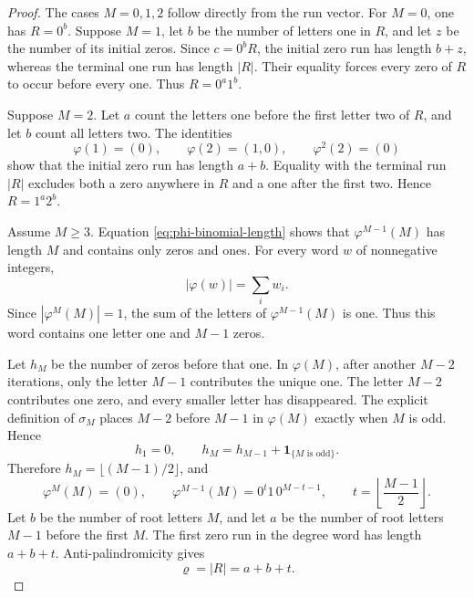 \documentclass[11pt]{article}
\theoremstyle{definition}
\theoremstyle{remark}
\begin{document}
\begin{proof}
The cases \(M=0,1,2\) follow directly from the run vector.  For
\(M=0\), one has \(R=0^b\).  Suppose \(M=1\), let \(b\) be the number of
letters one in \(R\), and let \(z\) be the number of its initial zeros.
Since \(c=0^bR\), the initial zero run has length \(b+z\), whereas the
terminal one run has length \(|R|\).  Their equality forces every zero of
\(R\) to occur before every one.  Thus \(R=0^a1^b\).

Suppose \(M=2\).  Let \(a\) count the letters one before the first letter two
of \(R\), and let \(b\) count all letters two.  The identities
\[
 \varphi(1)=(0),
 \qquad \varphi(2)=(1,0),
 \qquad \varphi^2(2)=(0)
\]
show that the initial zero run has length \(a+b\).  Equality with the
terminal run \(|R|\) excludes both a zero anywhere in \(R\) and a one after
the first two.  Hence \(R=1^a2^b\).

Assume \(M\geq3\).  Equation \eqref{eq:phi-binomial-length} shows that
\(\varphi^{M-1}(M)\) has length \(M\) and contains only zeros and ones.  For
every word \(w\) of nonnegative integers,
\[
 |\varphi(w)|=\sum_i w_i.
\]
Since \(|\varphi^M(M)|=1\), the sum of the letters of
\(\varphi^{M-1}(M)\) is one.  Thus this word contains one letter one and
\(M-1\) zeros.

Let \(h_M\) be the number of zeros before that one.  In \(\varphi(M)\), after
another \(M-2\) iterations, only the letter \(M-1\) contributes the unique
one.  The letter \(M-2\) contributes one zero, and every smaller letter has
disappeared.  The explicit definition of \(\sigma_M\) places \(M-2\) before
\(M-1\) in \(\varphi(M)\) exactly when \(M\) is odd.  Hence
\[
 h_1=0,
 \qquad
 h_M=h_{M-1}+\mathbf 1_{\{M\text{ is odd}\}}.
\]
Therefore \(h_M=\lfloor(M-1)/2\rfloor\), and
\begin{equation*}
 \varphi^M(M)=(0),
 \qquad
 \varphi^{M-1}(M)=0^t1\,0^{M-t-1},
 \qquad t=\left\lfloor\frac{M-1}{2}\right\rfloor.
\end{equation*}
Let \(b\) be the number of root letters \(M\), and let \(a\) be the number
of root letters \(M-1\) before the first \(M\).  The first zero run in the
degree word has length \(a+b+t\).  Anti-palindromicity gives
\begin{equation*}
 \varrho=|R|=a+b+t.
\end{equation*}


\end{proof}
\end{document}
